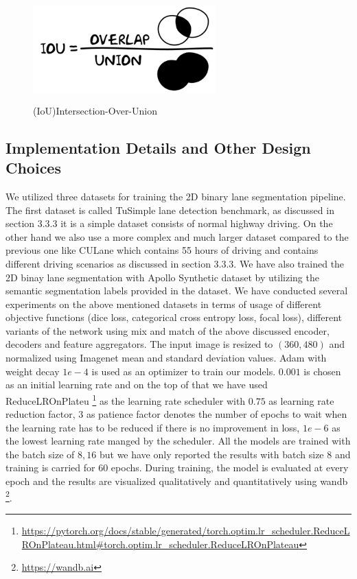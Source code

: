          \begin{figure}[h]
    \centering
    \includegraphics[width=7cm, height=4cm]{images/IOU.png}
    \caption{(IoU)Intersection-Over-Union \footnotemark}
    \end{figure}
        
        \subsection{Implementation Details and Other Design Choices}
        We utilized three datasets for training the 2D binary lane segmentation pipeline. The first dataset is called TuSimple lane detection benchmark\cite{Tusimple}, as discussed in section 3.3.3 it is a simple dataset consists of normal highway driving. On the other hand we also use a more complex and much larger dataset compared to the previous one like CULane\cite{pan2018SCNN} which contains 55 hours of driving and contains different driving scenarios as discussed in section 3.3.3. We have also trained the 2D binay lane segmentation with Apollo Synthetic dataset\cite{guo2020gen} by utilizing the semantic segmentation labels provided in the dataset. We have conducted several experiments on the above mentioned datasets in terms of usage of different objective functions (dice loss, categorical cross entropy loss, focal loss), different variants of the network using mix and match of the above discussed encoder, decoders and feature aggregators. The input image is resized to $(360,480)$ and normalized using Imagenet\cite{deng2009imagenet} mean and standard deviation values. Adam\cite{Kingma2015AdamAM} with weight decay $1e-4$ is used as an optimizer to train our models. $0.001$ is chosen as an initial learning rate and on the top of that we have used ReduceLROnPlateu \footnote{\url{https://pytorch.org/docs/stable/generated/torch.optim.lr_scheduler.ReduceLROnPlateau.html#torch.optim.lr_scheduler.ReduceLROnPlateau}} as the learning rate scheduler with $0.75$ as learning rate reduction factor, $3$ as patience factor denotes the number of epochs to wait when the learning rate has to be reduced if there is no improvement in loss, $1e-6$ as the lowest learning rate manged by the scheduler. All the models are trained with the batch size of $8, 16$ but we have only reported the results with batch size $8$ and training is carried for $60$ epochs. During training, the model is evaluated at every epoch and the results are visualized qualitatively and quantitatively using wandb \footnote{\url{https://wandb.ai}}.
        
